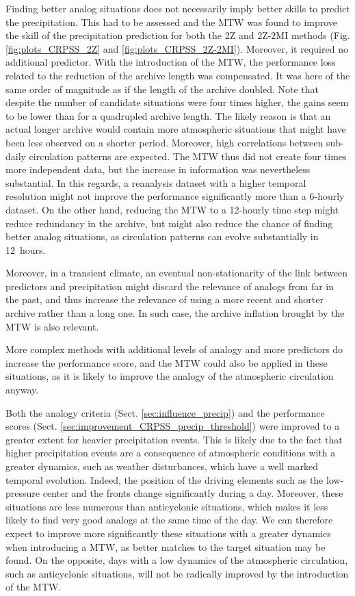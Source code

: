 \documentclass[hess, manuscript]{copernicus}
\begin{document}
Finding better analog situations does not necessarily imply better skills to predict the precipitation. This had to be assessed and the MTW was found to improve the skill of the precipitation prediction for both the 2Z and 2Z-2MI methods (Fig. \ref{fig:plots_CRPSS_2Z} and \ref{fig:plots_CRPSS_2Z-2MI}). Moreover, it required no additional predictor. With the introduction of the MTW, the performance loss related to the reduction of the archive length was compensated. It was here of the same order of magnitude as if the length of the archive doubled. Note that despite the number of candidate situations were four times higher, the gains seem to be lower than for a quadrupled archive length. The likely reason is that an actual longer archive would contain more atmospheric situations that might have been less observed on a shorter period. Moreover, high correlations between sub-daily circulation patterns are expected. The MTW thus did not create four times more independent data, but the increase in information was nevertheless substantial. In this regards, a reanalysis dataset with a higher temporal resolution might not improve the performance significantly more than a 6-hourly dataset. On the other hand, reducing the MTW to a 12-hourly time step might reduce redundancy in the archive, but might also reduce the chance of finding better analog situations, as circulation patterns can evolve substantially in 12~hours.

Moreover, in a transient climate, an eventual non-stationarity of the link between predictors and precipitation might discard the relevance of analogs from far in the past, and thus increase the relevance of using a more recent and shorter archive rather than a long one. In such case, the archive inflation brought by the MTW is also relevant.

More complex methods with additional levels of analogy and more predictors do increase the performance score, and the MTW could also be applied in these situations, as it is likely to improve the analogy of the atmospheric circulation anyway. 

Both the analogy criteria (Sect. \ref{sec:influence_precip}) and the performance scores (Sect. \ref{sec:improvement_CRPSS_precip_threshold}) were improved to a greater extent for heavier precipitation events. This is likely due to the fact that higher precipitation events are a consequence of atmospheric conditions with a greater dynamics, such as weather disturbances, which have a well marked temporal evolution. Indeed, the position of the driving elements such as the low-pressure center and the fronts change significantly during a day. Moreover, these situations are less numerous than anticyclonic situations, which makes it less likely to find very good analogs at the same time of the day. We can therefore expect to improve more significantly these situations with a greater dynamics when introducing a MTW, as better matches to the target situation may be found. On the opposite, days with a low dynamics of the atmospheric circulation, such as anticyclonic situations, will not be radically improved by the introduction of the MTW.
\end{document}
